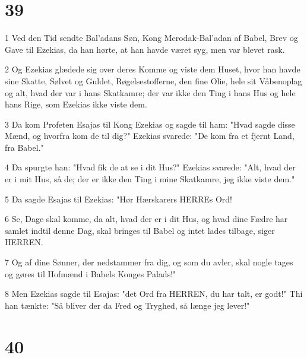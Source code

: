 \chapter{39}

\par 1 Ved den Tid sendte Bal'adans Søn, Kong Merodak-Bal'adan af Babel, Brev og Gave til Ezekias, da han hørte, at han havde været syg, men var blevet rask.
\par 2 Og Ezekias glædede sig over deres Komme og viste dem Huset, hvor han havde sine Skatte, Sølvet og Guldet, Røgelsestofferne, den fine Olie, hele sit Våbenoplag og alt, hvad der var i hans Skatkamre; der var ikke den Ting i hans Hus og hele hans Rige, som Ezekias ikke viste dem.
\par 3 Da kom Profeten Esajas til Kong Ezekias og sagde til ham: "Hvad sagde disse Mænd, og hvorfra kom de til dig?" Ezekias svarede: "De kom fra et fjernt Land, fra Babel."
\par 4 Da spurgte han: "Hvad fik de at se i dit Hus?" Ezekias svarede: "Alt, hvad der er i mit Hus, så de; der er ikke den Ting i mine Skatkamre, jeg ikke viste dem."
\par 5 Da sagde Esajas til Ezekias: "Hør Hærskarers HERREs Ord!
\par 6 Se, Dage skal komme, da alt, hvad der er i dit Hus, og hvad dine Fædre har samlet indtil denne Dag, skal bringes til Babel og intet lades tilbage, siger HERREN.
\par 7 Og af dine Sønner, der nedstammer fra dig, og som du avler, skal nogle tages og gøres til Hofmænd i Babels Konges Palads!"
\par 8 Men Ezekias sagde til Esajas: "det Ord fra HERREN, du har talt, er godt!" Thi han tænkte: "Så bliver der da Fred og Tryghed, så længe jeg lever!"

\chapter{40}

